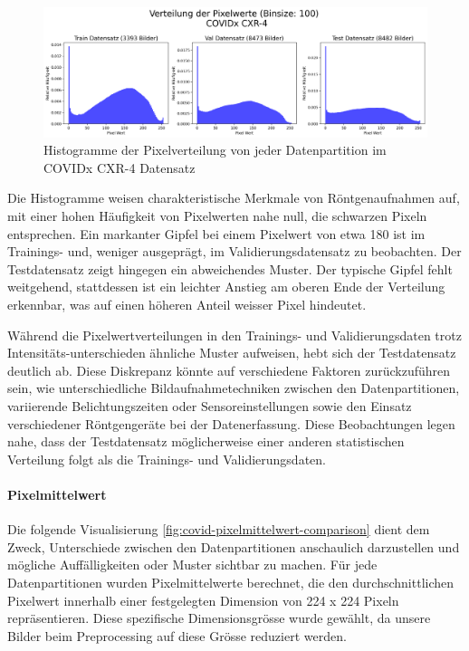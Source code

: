 \begin{figure}[H]
    \centering
    \includegraphics[width=\linewidth]{01-images/03-data/covid-Pixelverteilung-Partitionen.png}
    \caption{Histogramme der Pixelverteilung von jeder Datenpartition im COVIDx CXR-4 Datensatz}
    \label{fig:covid-datapartition-pixelverteilung-histo}
\end{figure}

Die Histogramme weisen charakteristische Merkmale von Röntgenaufnahmen auf, mit einer hohen Häufigkeit von Pixelwerten nahe null, die schwarzen Pixeln entsprechen. Ein markanter Gipfel bei einem Pixelwert von etwa 180 ist im Trainings- und, weniger ausgeprägt, im Validierungsdatensatz zu beobachten. Der Testdatensatz zeigt hingegen ein abweichendes Muster. Der typische Gipfel fehlt weitgehend, stattdessen ist ein leichter Anstieg am oberen Ende der Verteilung erkennbar, was auf einen höheren Anteil weisser Pixel hindeutet. 

Während die Pixelwertverteilungen in den Trainings- und Validierungsdaten trotz Intensitäts-unterschieden ähnliche Muster aufweisen, hebt sich der Testdatensatz deutlich ab. Diese Diskrepanz könnte auf verschiedene Faktoren zurückzuführen sein, wie unterschiedliche Bildaufnahmetechniken zwischen den Datenpartitionen, variierende Belichtungszeiten oder Sensoreinstellungen sowie den Einsatz verschiedener Röntgengeräte bei der Datenerfassung. Diese Beobachtungen legen nahe, dass der Testdatensatz möglicherweise einer anderen statistischen Verteilung folgt als die Trainings- und Validierungsdaten.

\paragraph{Pixelmittelwert} \label{chap:COVID19-pixelmittelwert}
Die folgende Visualisierung \ref{fig:covid-pixelmittelwert-comparison} dient dem Zweck, Unterschiede zwischen den Datenpartitionen anschaulich darzustellen und mögliche Auffälligkeiten oder Muster sichtbar zu machen. Für jede Datenpartitionen wurden Pixelmittelwerte berechnet, die den durchschnittlichen Pixelwert innerhalb einer festgelegten Dimension von 224 x 224 Pixeln repräsentieren. Diese spezifische Dimensionsgrösse wurde gewählt, da unsere Bilder beim Preprocessing auf diese Grösse reduziert werden.

